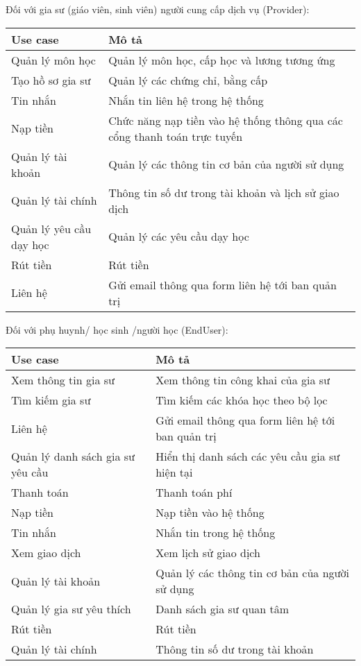 \documentclass[12pt,a4paper]{report}
\begin{document}
Đối với gia sư (giáo viên, sinh viên) người cung cấp dịch vụ (Provider):
\begin{center}
 \begin{tabular}{|>{\raggedright\arraybackslash}m{4cm}|>{\raggedright\arraybackslash}m{11.5cm}|}
 \hline 
\textbf{Use case} & \textbf{Mô tả} \\
\hline 
Quản lý môn học & Quản lý môn học, cấp học và lương tương ứng \\ 
\hline 
Tạo hồ sơ gia sư & Quản lý các chứng chỉ, bằng cấp \\ 
\hline 
Tin nhắn & Nhắn tin liên hệ trong hệ thống \\ 
\hline 
Nạp tiền & Chức năng nạp tiền vào hệ thống thông qua các cổng thanh toán trực tuyến \\ 
\hline 
Quản lý tài khoản & Quản lý các thông tin cơ bản của người sử dụng \\ 
\hline 
Quản lý tài chính & Thông tin số dư trong tài khoản và lịch sử giao dịch \\ 
\hline 
 Quản lý yêu cầu dạy học & Quản lý các yêu cầu dạy học \\ 
\hline 
Rút tiền & Rút tiền \\ 
\hline 
Liên hệ & Gửi email thông qua form liên hệ tới ban quản trị \\ 
\hline 
 \end{tabular}
\end{center} 

Đối với phụ huynh/ học sinh /người học (EndUser):
\begin{center}
 \begin{tabular}{|>{\raggedright\arraybackslash}m{4cm}|>{\raggedright\arraybackslash}m{11.5cm}|}
 \hline 
\textbf{Use case} & \textbf{Mô tả} \\
\hline 
 Xem thông tin gia sư & Xem thông tin công khai của gia sư \\ 
\hline 
 Tìm kiếm gia sư & Tìm kiếm các khóa học theo bộ lọc \\ 
\hline 
 Liên hệ & Gửi email thông qua form liên hệ tới ban quản trị \\ 
\hline 
 Quản lý danh sách gia sư yêu cầu & Hiển thị danh sách các yêu cầu gia sư hiện tại \\ 
\hline 
Thanh toán & Thanh toán phí  \\ 
\hline 
Nạp tiền & Nạp tiền vào hệ thống \\ 
\hline 
 Tin nhắn & Nhắn tin trong hệ thống \\ 
\hline 
 Xem giao dịch & Xem lịch sử giao dịch \\ 
\hline 
Quản lý tài khoản & Quản lý các thông tin cơ bản của người sử dụng \\ 
\hline 
Quản lý gia sư yêu thích & Danh sách gia sư quan tâm \\ 
\hline 
 Rút tiền & Rút tiền \\ 
\hline 
 Quản lý tài chính & Thông tin số dư trong tài khoản \\ 
\hline 
\end{tabular}
 \end{center} 
 
\end{document}
